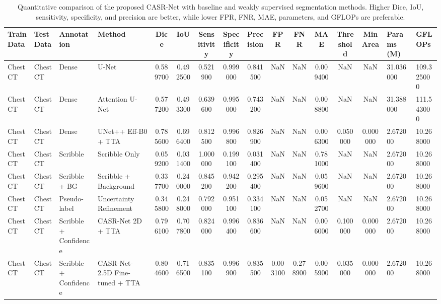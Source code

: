 \begin{table}
\caption{Quantitative comparison of the proposed CASR-Net with baseline and weakly supervised segmentation methods. Higher Dice, IoU, sensitivity, specificity, and precision are better, while lower FPR, FNR, MAE, parameters, and GFLOPs are preferable.}
\label{tab:quantitative_comparison}
\begin{tabular}{lll l cccccccccc}
\toprule
Train Data & Test Data & Annotation & Method & Dice & IoU & Sensitivity & Specificity & Precision & FPR & FNR & MAE & Threshold & Min Area & Params (M) & GFLOPs \\
\midrule
Chest CT & Chest CT & Dense & U-Net & 0.589700 & 0.492500 & 0.521900 & 0.999000 & 0.841500 & NaN & NaN & 0.009400 & NaN & NaN & 31.036000 & 109.325000 \\
Chest CT & Chest CT & Dense & Attention U-Net & 0.577200 & 0.493300 & 0.639600 & 0.995000 & 0.743200 & NaN & NaN & 0.008800 & NaN & NaN & 31.388000 & 111.543000 \\
Chest CT & Chest CT & Dense & UNet++ Eff-B0 + TTA & 0.785600 & 0.696400 & 0.812500 & 0.996800 & 0.826900 & NaN & NaN & 0.006300 & 0.050000 & 0.000000 & 2.672000 & 10.268000 \\
Chest CT & Chest CT & Scribble & Scribble Only & 0.059200 & 0.031400 & 1.000000 & 0.199100 & 0.031400 & NaN & NaN & 0.781000 & NaN & NaN & 2.672000 & 10.268000 \\
Chest CT & Chest CT & Scribble + BG & Scribble + Background & 0.337700 & 0.240000 & 0.845200 & 0.942200 & 0.295400 & NaN & NaN & 0.059600 & NaN & NaN & 2.672000 & 10.268000 \\
Chest CT & Chest CT & Pseudo-label & Uncertainty Refinement & 0.345800 & 0.248000 & 0.792000 & 0.951100 & 0.334100 & NaN & NaN & 0.052700 & NaN & NaN & 2.672000 & 10.268000 \\
Chest CT & Chest CT & Scribble + Confidence & CASR-Net 2D + TTA & 0.796100 & 0.707800 & 0.824000 & 0.996400 & 0.836600 & NaN & NaN & 0.006000 & 0.100000 & 0.000000 & 2.672000 & 10.268000 \\
Chest CT & Chest CT & Scribble + Confidence & CASR-Net-2.5D Fine-tuned + TTA & 0.804600 & 0.716500 & 0.835100 & 0.996900 & 0.835500 & 0.003100 & 0.278900 & 0.005900 & 0.035000 & 0.000000 & 2.672000 & 10.268000 \\
\bottomrule
\end{tabular}
\end{table}
